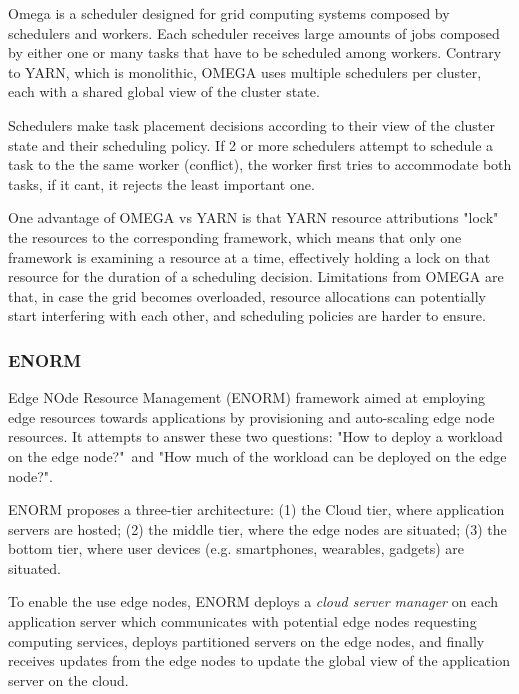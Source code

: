 Omega \cite{41684} is a scheduler designed for grid computing systems composed by schedulers and workers. Each scheduler receives large amounts of jobs composed by either one or many tasks that  have to be scheduled among workers. Contrary to YARN, which is monolithic, OMEGA uses multiple schedulers per cluster, each with a shared global view of the cluster state.

Schedulers make task placement decisions according to their view of the cluster state and their scheduling policy. If 2 or more schedulers attempt to schedule a task to the the same worker (conflict), the worker first tries to 
accommodate both tasks, if it cant, it rejects the least important one.

One advantage of OMEGA vs YARN is that YARN resource attributions "lock" the resources to the corresponding framework,  which means that only one framework is examining a resource at a time, effectively holding a lock on that resource for the duration of a scheduling decision. Limitations from OMEGA are that, in case the grid becomes overloaded, resource allocations can potentially start interfering with each other, and scheduling policies are harder to ensure.

\subsubsection{ENORM}

Edge NOde Resource Management \cite{wang2017enorm} (ENORM) framework aimed at employing edge resources towards applications by provisioning and auto-scaling edge node resources. It attempts to answer these two questions: "How to deploy a workload on the edge node?"\ and "How much of the workload can be deployed on the edge node?".

ENORM proposes a three-tier architecture: (1) the Cloud tier, where application servers are hosted; (2) the middle tier, where the edge nodes are situated; (3) the bottom tier, where user devices (e.g. smartphones, wearables, gadgets) are situated. 

To enable the use edge nodes, ENORM deploys a \textit{cloud server manager} on each application server which communicates with potential edge nodes requesting computing services, deploys partitioned servers on the edge nodes, and finally receives updates from the edge nodes to update the global view of the application server on the cloud.

